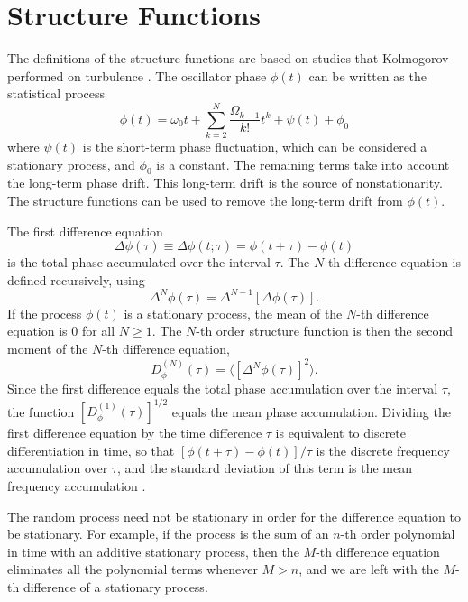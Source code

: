 \section{Structure Functions} \label{sec:structure}

The definitions of the structure functions are based on studies that Kolmogorov performed on turbulence \cite{Lindsey1976}. The oscillator phase $\phi(t)$ can be written as the statistical process
%
\begin{equation} \label{eq:phaseprocess}
\phi(t) = \omega_0t + \sum_{k=2}^{N} \frac{\Omega_{k-1}}{k!}t^k + \psi(t) + \phi_0
\end{equation}
%
where $\psi(t)$ is the short-term phase fluctuation, which can be considered a stationary process, and $\phi_0$ is a constant. The remaining terms take into account the long-term phase drift. This long-term drift is the source of nonstationarity. The structure functions can be used to remove the long-term drift from $\phi(t)$. 

The first difference equation
%
\begin{equation}
\Delta\phi(\tau) \equiv \Delta\phi(t;\tau) = \phi(t+\tau) - \phi(t)
\end{equation}
%
is the total phase accumulated over the interval $\tau$. The $N$-th difference equation is defined recursively, using
%
\begin{equation}
\Delta^N\phi(\tau) = \Delta^{N-1}\left[\Delta\phi(\tau)\right].
\end{equation}
%
If the process $\phi(t)$ is a stationary process, the mean of the $N$-th difference equation is $0$ for all $N\ge 1$. The $N$-th order structure function is then the second moment of the $N$-th difference equation,
\begin{equation}
D_\phi^{(N)}(\tau) = \langle [\Delta^N\phi(\tau)]^2 \rangle.
\end{equation}
%
Since the first difference equals the total phase accumulation over the interval $\tau$, the function $[D_\phi^{(1)}(\tau)]^{1/2}$ equals the mean phase accumulation. Dividing the first difference equation by the time difference $\tau$ is equivalent to discrete differentiation in time, so that $[\phi(t+\tau) - \phi(t)]/\tau$ is the discrete frequency accumulation over $\tau$, and the standard deviation of this term is the mean frequency accumulation \cite{Lindsey1976}.

The random process need not be stationary in order for the difference equation to be stationary. For example, if the process is the sum of an $n$-th order polynomial in time with an additive stationary process, then the $M$-th difference equation eliminates all the polynomial terms whenever $M > n$, and we are left with the $M$-th difference of a stationary process. 

